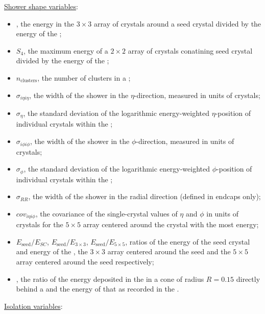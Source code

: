 \underline{Shower shape variables}:
\begin{itemize}
\item \RNINE, the energy in the $3\times3$ array of crystals around a seed crystal divided by the energy of the \SC;
\item $S_{4}$, the maximum energy of a $2\times2$ array of crystals conatining seed crystal divided by the energy of the \SC;
\item $n_{\textrm{clusters}}$, the number of clusters in a \SC;
\item $\sigma_{i\eta i\eta}$, the width of the shower in the $\eta$-direction, measured in units of crystals;
\item $\sigma_{\eta}$, the standard deviation of the logarithmic energy-weighted $\eta$-position of individual crystals within the \SC;
\item $\sigma_{i\phi i\phi}$, the width of the shower in the $\phi$-direction, measured in units of crystals;
\item $\sigma_{\phi}$, the standard deviation of the logarithmic energy-weighted $\phi$-position of individual crystals within the \SC;
\item $\sigma_{RR}$, the width of the shower in the radial direction (defined in endcaps only);
\item $cov_{i\eta i\phi}$, the covariance of the single-crystal values of $\eta$ and $\phi$ in units of crystals for the $5\times5$ array centered around the crystal with the most energy; %
\item $E_{\textrm{seed}}/E_{SC}$, $E_{\textrm{seed}}/E_{3\times3}$, $E_{\textrm{seed}}/E_{5\times5}$, ratios of the energy of the seed crystal and energy of the \SC, the $3\times3$ array centered around the seed and the $5\times5$ array centered around the seed respectively;
\item \HoE, the ratio of the energy deposited in the \HCAL in a cone of radius $R=0.15$ directly behind a \SC and the energy of that \SC as recorded in the \ECAL. 
\end{itemize}
\underline{Isolation variables}:
